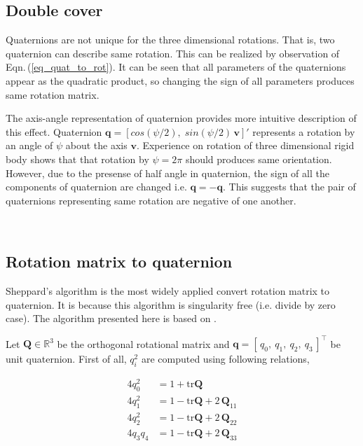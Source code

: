 \documentclass[12pt]{article}
\begin{document}
\subsection{Double cover}
Quaternions are not unique for the three dimensional rotations. That is, two quaternion can describe same rotation. This can be realized by observation of Eqn.\,(\ref{eq_quat_to_rot}). It can be seen that all parameters of the quaternions appear as the quadratic product, so changing the sign of all parameters produces same rotation matrix. 

The axis-angle representation of quaternion provides more intuitive description of this effect. Quaternion $\bm{q} = [cos(\psi/2), \; sin(\psi/2) \, \bm{v}]'$ represents a rotation by an angle of $\psi$ about the axis $\bm{v}$. Experience on rotation of  three dimensional rigid body shows that that rotation by $\psi = 2\pi$ should produces same orientation. However, due to the presense of half angle in quaternion, the sign of all the components of quaternion are changed i.e. $\bm{q} = -\bm{q}$. This suggests that the pair of quaternions representing same rotation are negative of one another.

\

\subsection{Rotation matrix to quaternion}
Sheppard's algorithm is the most widely applied convert rotation matrix to quaternion. It is because this algorithm is singularity free (i.e. divide by zero case). The algorithm presented here is based on \cite{markley2008}.

Let $\bm{Q} \in \mathbb{R}^{3}$ be the orthogonal rotational matrix and $\bm{q} = [\, q_{0} ,\: q_{1} ,\: q_{2},\: q_{3}\,]^\intercal$ be unit quaternion. First of all, $q_{i}^{2}$ are computed using following relations,

\begin{equation}
    \begin{split}
        4q_{0}^{2} &= 1 + \text{tr}\bm{Q} \\
        4q_{1}^{2} &= 1 - \text{tr}\bm{Q} + 2\,\bm{Q}_{11} \\
        4q_{2}^{2} &= 1 - \text{tr}\bm{Q} + 2\,\bm{Q}_{22} \\
        4q_{3}q_{4} &= 1 - \text{tr}\bm{Q} + 2\,\bm{Q}_{33} \\
    \end{split}
    \label{eqn_find_large}
\end{equation}
\end{document}

